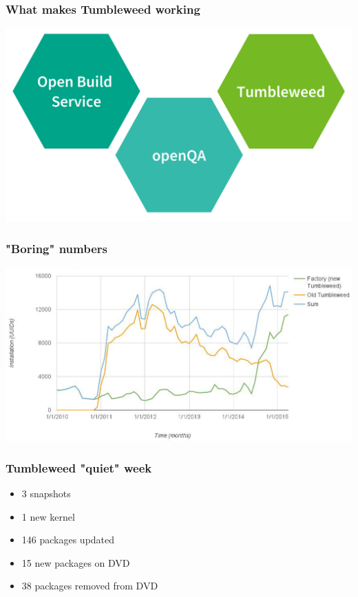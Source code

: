 \documentclass{beamer}
\begin{document}
\begin{frame}[t]
\frametitle{What makes Tumbleweed working}
\begin{center}
\includegraphics[width=.8\paperwidth]{tumbleweed-components}
\end{center}
\end{frame}

\begin{frame}[t]
\frametitle{"Boring" numbers}
\begin{center}
\includegraphics[width=.9\paperwidth]{tumbleweed-installs}
\end{center}
\end{frame}

\begin{frame}[t]
\frametitle{Tumbleweed "quiet" week}
\begin{itemize}
\item 3 snapshots
\item 1 new kernel
\item 146 packages updated
\item 15 new packages on DVD
\item 38 packages removed from DVD
\end{itemize}
\end{frame}
\end{document}
